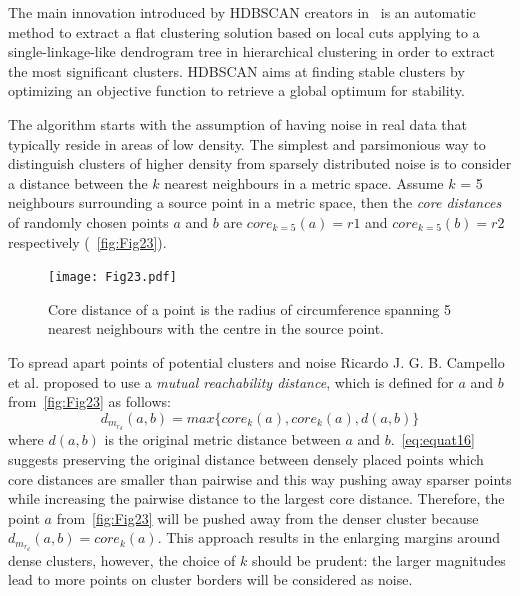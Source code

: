 The main innovation introduced by HDBSCAN creators in~\cite{HDBSCAN} is an automatic method to extract a flat clustering solution based on local cuts applying to a single-linkage-like dendrogram tree in hierarchical clustering in order to extract the most significant clusters. HDBSCAN aims at finding stable clusters by optimizing an objective function to retrieve a global optimum for stability.

The algorithm starts with the assumption of having noise in real data that typically reside in areas of low density. The simplest and parsimonious way to distinguish clusters of higher density from sparsely distributed noise is to consider a distance between the $k$ nearest neighbours in a metric space. Assume $k$ = 5 neighbours surrounding a source point in a metric space, then the \textit{core distances} of randomly chosen points $a$ and $b$ are $core_{k=5}(a)=r1$ and $core_{k=5}(b)=r2$ respectively (~\autoref{fig:Fig23}).

\begin{figure}[H]
    \centering
    \texttt{[image: Fig23.pdf]}
    \caption{Core distance of a point is the radius of circumference spanning 5 nearest neighbours with the centre in the source point.}
    \label{fig:Fig23}
\end{figure}

To spread apart points of potential clusters and noise Ricardo J. G. B. Campello et al. proposed to use a \textit{mutual reachability distance}, which is defined for $a$ and $b$ from~\autoref{fig:Fig23} as follows:
\begin{equation}
  d_{m_r_d}(a,b)=max\{core_{k}(a), core_{k}(a), d(a,b)\}
  \label{eq:equat16}
\end{equation}
where $d(a,b)$ is the original metric distance between $a$ and $b$.~\autoref{eq:equat16} suggests preserving the original distance between densely placed points which core distances are smaller than pairwise and this way pushing away sparser points while increasing the pairwise distance to the largest core distance. Therefore, the point $a$ from~\autoref{fig:Fig23} will be pushed away from the denser cluster because $d_{m_r_d}(a,b) = core_{k}(a)$. This approach results in the enlarging margins around dense clusters, however, the choice of $k$ should be prudent: the larger magnitudes lead to more points on cluster borders will be considered as noise.


